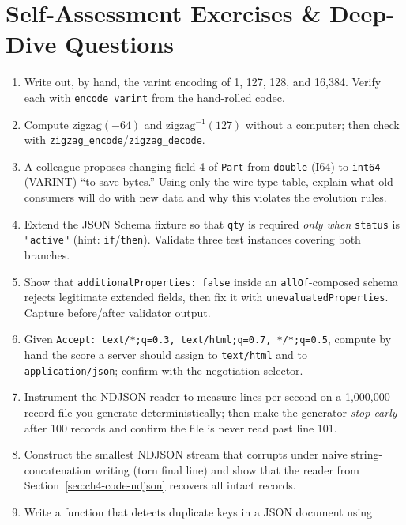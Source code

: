 \section{Self-Assessment Exercises \& Deep-Dive Questions}
\label{sec:ch4-exercises}

\begin{enumerate}[label=\textbf{E4.\arabic*}, leftmargin=1.5cm]
  \item Write out, by hand, the varint encoding of 1, 127, 128, and 16{,}384.
        Verify each with \texttt{encode\_varint} from the hand-rolled codec.
  \item Compute $\text{zigzag}(-64)$ and $\text{zigzag}^{-1}(127)$ without a
        computer; then check with \texttt{zigzag\_encode}/\texttt{zigzag\_decode}.
  \item A colleague proposes changing field 4 of \texttt{Part} from
        \texttt{double} (I64) to \texttt{int64} (VARINT) ``to save bytes.'' Using
        only the wire-type table, explain what old consumers will do with new data
        and why this violates the evolution rules.
  \item Extend the JSON Schema fixture so that \texttt{qty} is required
        \emph{only when} \texttt{status} is \texttt{"active"} (hint:
        \texttt{if}/\texttt{then}). Validate three test instances covering both
        branches.
  \item Show that \texttt{additionalProperties: false} inside an
        \texttt{allOf}-composed schema rejects legitimate extended fields, then fix
        it with \texttt{unevaluatedProperties}. Capture before/after validator
        output.
  \item Given \texttt{Accept: text/*;q=0.3, text/html;q=0.7, */*;q=0.5}, compute by
        hand the score a server should assign to \texttt{text/html} and to
        \texttt{application/json}; confirm with the negotiation selector.
  \item Instrument the NDJSON reader to measure lines-per-second on a 1{,}000{,}000
        record file you generate deterministically; then make the generator
        \emph{stop early} after 100 records and confirm the file is never read past
        line 101.
  \item Construct the smallest NDJSON stream that corrupts under naive
        string-concatenation writing (torn final line) and show that the reader
        from Section~\ref{sec:ch4-code-ndjson} recovers all intact records.
  \item Write a function that detects duplicate keys in a JSON document using

\end{enumerate}

